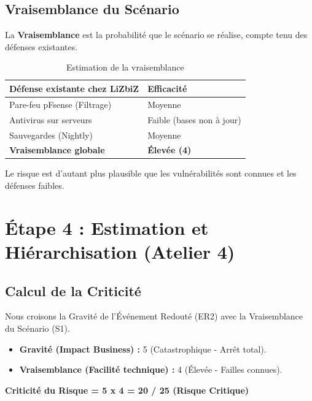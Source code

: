 \subsection{Vraisemblance du Scénario}

La \textbf{Vraisemblance} est la probabilité que le scénario se réalise, compte tenu des défenses existantes.

\begin{table}[htbp]
\centering
\begin{tabular}{p{5cm}p{2cm}}
    \toprule
    \textbf{Défense existante chez LiZbiZ} & \textbf{Efficacité} \\
    \midrule
    Pare-feu pFsense (Filtrage) & Moyenne \\
    Antivirus sur serveurs & Faible (bases non à jour) \\
    Sauvegardes (Nightly) & Moyenne \\
    \textbf{Vraisemblance globale} & \textbf{Élevée (4)} \\
    \bottomrule
\end{tabular}
\caption{Estimation de la vraisemblance}
\end{table}

Le risque est d'autant plus plausible que les vulnérabilités sont connues et les défenses faibles.

\section{Étape 4 : Estimation et Hiérarchisation (Atelier 4)}

\subsection{Calcul de la Criticité}

Nous croisons la Gravité de l'Événement Redouté (ER2) avec la Vraisemblance du Scénario (S1).

\begin{itemize}
    \item \textbf{Gravité (Impact Business) :} 5 (Catastrophique - Arrêt total).
    \item \textbf{Vraisemblance (Facilité technique) :} 4 (Élevée - Failles connues).
\end{itemize}

\begin{center}
\textbf{Criticité du Risque = 5 x 4 = 20 / 25 (Risque Critique)}
\end{center}

